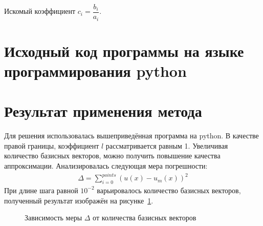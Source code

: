 \documentclass[12pt,a4paper,oneside]{extarticle}
\begin{document}
    Искомый коэффициент $c_i = \dfrac{b_i}{a_i}.$

\clearpage    
\section{Исходный код программы на языке программирования python}
     

\section{Результат применения метода}
    Для решения использовалась вышеприведённая программа на python. В качестве правой границы, коэффициент $l$ рассматривается равным 1. Увеличивая количество базисных векторов, можно получить повышение качества аппроксимации. Анализировалась следующая мера погрешности:
    \begin{gather}
        \Delta = \sum\limits_{i=0}^{points} (u(x) - u_m(x))^2 \nonumber
    \end{gather}
    При длине шага равной $10^{-2}$ варьировалось количество базисных векторов, полученный результат изображён на рисунке~\ref{pic:res}.

    \begin{figure}[ht!]
        \centering
        \caption{Зависимость меры $\Delta$ от количества базисных векторов}
        \label{pic:res}
    \end{figure}
\end{document}
